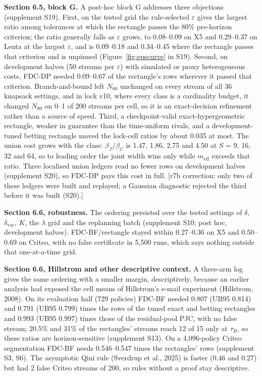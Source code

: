 \documentclass[sigconf,anonymous,review]{acmart}
\newcommand{\eps}{\varepsilon}
\newcommand{\dvar}{\delta_{\text{var}}}
\newcommand{\meff}{m_{\text{eff}}}
\begin{document}
\textbf{Section 6.5, block G.} A post-hoc block G addresses three objections (supplement S19). First, on the tested grid the rule-selected $\eps$ gives the largest ratio among tolerances at which the rectangle passes the 80\% pre-horizon criterion; the ratio generally falls as $\eps$ grows, to 0.08--0.09 on X5 and 0.29--0.37 on Lenta at the largest $\eps$, and is 0.09--0.18 and 0.34--0.45 where the rectangle passes that criterion and is unpinned (Figure~\ref{fig:epscurve} in S19). Second, on development halves (50 streams per $\eps$) with simulated or proxy heterogeneous costs, FDC-DP needed 0.09--0.67 of the rectangle's rows wherever it passed that criterion. Branch-and-bound left $N_{80}$ unchanged on every stream of all 36 knapsack settings, and in lock v10, where every class is a cardinality budget, it changed $N_{80}$ on 0--1 of 200 streams per cell, so it is an exact-decision refinement rather than a source of speed. Third, a checkpoint-valid exact-hypergeometric rectangle, weaker in guarantee than the time-uniform rivals, and a development-tuned betting rectangle moved the lock-cell ratios by about 0.035 at most. The union cost grows with the class: $\beta_J/\beta_C$ is 1.47, 1.86, 2.75 and 4.50 at $S$ = 9, 16, 32 and 64, so to leading order the joint width wins only while $\meff$ exceeds that ratio. Three localised union ledgers read no fewer rows on development halves (supplement S20), so FDC-DP pays this cost in full. [r7b correction: only two of these ledgers were built and replayed; a Gaussian diagnostic rejected the third before it was built (S20).]

\textbf{Section 6.6, robustness.} The ordering persisted over the tested settings of $\delta$, $\dvar$, $K$, the $\lambda$ grid and the replanning batch (supplement S10; post hoc, development halves). FDC-BF/rectangle stayed within 0.27--0.36 on X5 and 0.50--0.69 on Criteo, with no false certificate in 5,500 runs, which says nothing outside that one-at-a-time grid.

\textbf{Section 6.6, Hillstrom and other descriptive context.} A three-arm log gives the same ordering with a smaller margin, descriptively, because an earlier analysis had exposed the cell means of Hillstrom's e-mail experiment (Hillstrom, 2008). On its evaluation half (729 policies) FDC-BF needed 0.807 (UB95 0.814) and 0.791 (UB95 0.799) times the rows of the tuned exact and betting rectangles and 0.993 (UB95 0.997) times those of the residual-pool PJC, with no false stream; 20.5\% and 31\% of the rectangles' streams reach 12 of 15 only at $\tau_R$, so these ratios are horizon-sensitive (supplement S13). On a 4,096-policy Criteo segmentation FDC-BF needs 0.546--0.547 times the rectangles' rows (supplement S3, S6). The asymptotic Qini rule (Sverdrup et al., 2025) is faster (0.46 and 0.27) but had 2 false Criteo streams of 200, so rules without a proof stay descriptive.
\end{document}
